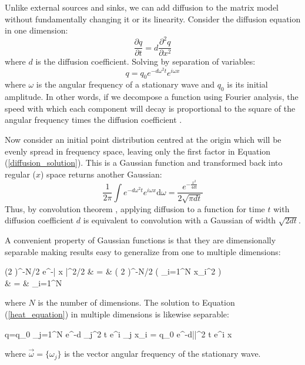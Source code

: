 Unlike external sources and sinks, we can add diffusion to the matrix model 
without fundamentally changing it or its linearity. 
Consider the diffusion equation in one dimension:
\begin{equation}
  \frac{\partial q}{\partial t}=d \frac{\partial^2 q}{\partial x^2}
  \label{heat_equation}
\end{equation}
where $d$ is the diffusion coefficient.
Solving by separation of variables:
\begin{equation}
  q=q_0 e^{-d \omega^2 t} e^{i \omega x}
  \label{diffusion_solution}
\end{equation}
where $\omega$ is the angular frequency of a stationary wave
and $q_0$ is its initial amplitude.
In other words, if we decompose a function using Fourier analysis, the speed
with which each component will decay is proportional to the square of the
angular frequency times the diffusion coefficient \citep{Cannon1984}.

Now consider an initial point distribution centred at the origin 
which will be evenly spread
in frequency space, leaving only the first factor in 
Equation (\ref{diffusion_solution}). 
This is a Gaussian function and transformed
back into regular ($x$) space returns another Gaussian:
\begin{equation}
	\frac{1}{2 \pi} \int e^{-d \omega^2 t} e^{i \omega x} \mathrm d \omega = \frac{e^{-\frac{x^2}{4 d t}}}{2 \sqrt{\pi d t}}
	\label{Gaussian_diffusion}
\end{equation}
Thus, by convolution theorem \citep{Katznelson1976}, 
applying diffusion to a function for time $t$ 
with diffusion coefficient $d$ 
is equivalent to convolution with a Gaussian of width $\sqrt{2 d t}$.

A convenient property of Gaussian functions 
is that they are dimensionally separable
making results easy to generalize from one to multiple dimensions:
\begin{eqanl}
	\left (2 \pi \right )^{-N/2} e^{-| \vec x |^2/2} 
	& = & \left ( 2 \pi \right )^{-N/2} \exp \left (  \sum_{i=1}^N x_i^2 \right ) \\
	& = & \prod_{i=1}^N 
\end{eqanl}
where $N$ is the number of dimensions.
The solution to Equation (\ref{heat_equation}) in multiple dimensions is likewise
separable:
\begin{eqnl}
	q=q_0 \prod_{j=1}^N e^{-d \omega_j^2 t} e^{i \omega_j x_i} = q_0 e^{-d|\vec \omega|^2 t} e^{i \vec \omega \cdot \vec x}
\end{eqnl}
where $\vec \omega=\lbrace \omega_j \rbrace$ is the vector angular frequency
of the stationary wave.

